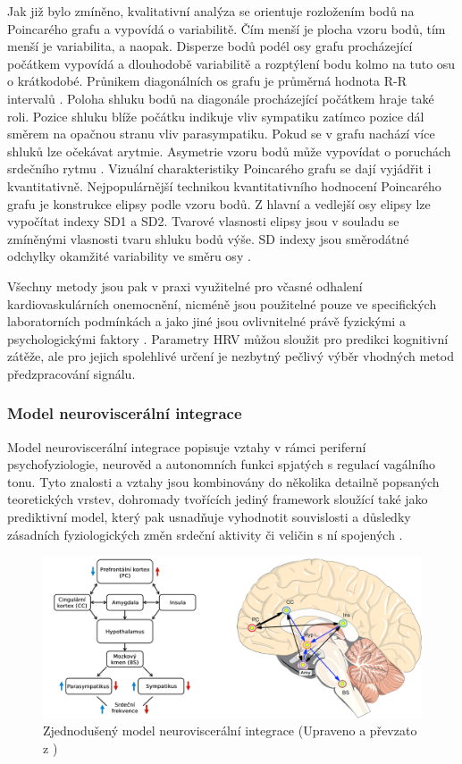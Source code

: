 Jak již bylo zmíněno, kvalitativní analýza se orientuje rozložením bodů na
Poincarého grafu a vypovídá o variabilitě. Čím menší je plocha vzoru bodů, tím
menší je variabilita, a naopak. Disperze bodů podél osy grafu procházející
počátkem vypovídá a dlouhodobě variabilitě a rozptýlení bodu kolmo na tuto osu o
krátkodobé. Průnikem diagonálních os grafu je průměrná hodnota R-R intervalů
\cite{Hejjel2001}. Poloha shluku bodů na diagonále procházející počátkem hraje
také roli. Pozice shluku blíže počátku indikuje vliv sympatiku zatímco pozice
dál směrem na opačnou stranu vliv parasympatiku. Pokud se v grafu nachází více
shluků lze očekávat arytmie. Asymetrie vzoru bodů může vypovídat o poruchách
srdečního rytmu \cite{Habib2013}. Vizuální charakteristiky Poincarého grafu se
dají vyjádřit i kvantitativně. Nejpopulárnější technikou kvantitativního
hodnocení Poincarého grafu je konstrukce elipsy podle vzoru bodů. Z hlavní a
vedlejší osy elipsy lze vypočítat indexy SD1 a SD2. Tvarové vlasnosti elipsy
jsou v souladu se zmíněnými vlasnosti tvaru shluku bodů výše. SD indexy jsou
směrodátné odchylky okamžité variability ve směru osy
\cite{Habib2013,Mazhar2007}.

Všechny metody jsou pak v praxi využitelné pro včasné odhalení
kardiovaskulárních onemocnění, nicméně jsou použitelné pouze ve specifických
laboratorních podmínkách a jako jiné jsou ovlivnitelné právě fyzickými a
psychologickými faktory \cite{Habib2013,Kubickova2016}. Parametry HRV můžou
sloužit pro predikci kognitivní zátěže, ale pro jejich spolehlivé určení je
nezbytný pečlivý výběr vhodných metod předzpracování signálu.

\subsubsection{Model neuroviscerální integrace}
Model neuroviscerální integrace popisuje vztahy v rámci periferní
psychofyziologie, neurověd a autonomních funkci spjatých s regulací vagálního
tonu. Tyto znalosti a vztahy jsou kombinovány do několika detailně popsaných
teoretických vrstev, dohromady tvořících jediný framework sloužící také jako
prediktivní model, který pak usnadňuje vyhodnotit souvislosti a důsledky
zásadních fyziologických změn srdeční aktivity či veličin s ní spojených
\cite{Smith2017}.

\begin{figure}[h]
	\begin{center}
		\includegraphics[width=1\textwidth]{../assets/diagrams/nvi}
		\caption{Zjednodušený model neuroviscerální integrace (Upraveno a převzato z \cite{NVI20017})}
		\label{fig:nvi_model}
	\end{center}
\end{figure}

